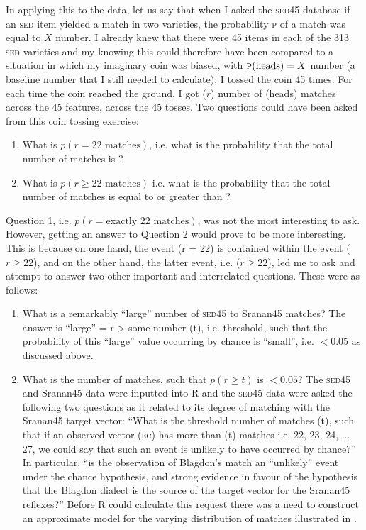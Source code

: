 In applying this to the data, let us say that when I asked the \textsc{sed45} database if an \textsc{sed} item yielded a match in two varieties, the probability \textsc{p} of a match was equal to $X$ number. I already knew that there were 45 items in each of the 313 \textsc{sed} varieties and my knowing this could therefore have been compared to a situation in which my imaginary coin was biased, with $\textsc{p}(\text{heads}) = X$ number (a baseline number that I still needed to calculate); I tossed the coin 45 times. For each time the coin reached the ground, I got ($r$) number of (heads) matches across the 45 features, across the 45 tosses. Two questions could have been asked from this coin tossing exercise:

\begin{enumerate}
\item {What is $p(r = 22 \text{ matches})$, i.e. what is the probability that the total number of matches is ?}
\item{What is $p(r \geq 22 \text{ matches})$ i.e. what is the probability that the total number of matches is equal to or greater than ?}
\end{enumerate}

Question 1, i.e. $p(r = \text{exactly 22 matches})$, was not the most interesting to ask. However, getting an answer to Question 2 would prove to be more interesting. This is because on one hand, the event (r = 22) is contained within the event ($r\geq 22$), and on the other hand, the latter event, i.e. ($r \geq  22$), led me to ask and attempt to answer two other important and interrelated questions. These were as follows:

\begin{enumerate}
\item {What is a remarkably ``large'' number of \textsc{sed45} to Sranan45 matches? The answer is ``large'' = r > some number (t), i.e. threshold, such that the probability of this ``large'' value occurring by chance is ``small'', i.e. $<0.05$ as discussed above.}
\item{What is the number of matches, such that $p(r \geq t)$ is $<0.05$? The \textsc{sed45} and Sranan45 data were inputted into R and the \textsc{sed45} data were asked the following two questions as it related to its degree of matching with the  Sranan45 target vector: ``What is the threshold number of matches (t), such that if an observed vector (\textsc{ec}) has more than (t) matches i.e. 22, 23, 24, ... 27, we could say that such an event is unlikely to have occurred by chance?'' In particular, ``is the observation of Blagdon's  match an ``unlikely'' event under the chance hypothesis, and strong evidence in favour of the hypothesis that the Blagdon dialect is the source of the target vector for the Sranan45 reflexes?'' Before R could calculate this request there was a need to construct an approximate model for the varying distribution of matches illustrated in .}
\end{enumerate}

